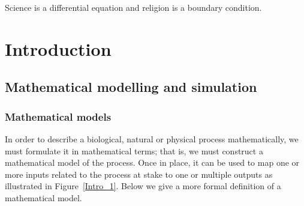 \begin{savequote}[75mm]
Science is a differential equation and religion is a boundary condition.
\end{savequote}

\chapter{Introduction}
\graphicspath{{figures/IntroDE/}}

%
%
%
%
%
%
%
%
%

\section{Mathematical modelling and simulation}
\label{models}
\subsection{Mathematical models}
In order to describe a biological, natural or physical process mathematically, we must  formulate it in mathematical terms; that is, we must construct a mathematical model of the process. Once in place, it can be used to map one or more inputs related to the process at stake to one or multiple outputs as illustrated in Figure~\ref{Intro_1}. Below we give a more formal definition of a mathematical model. 

